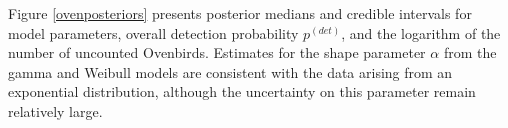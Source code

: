 \documentclass[12pt]{article}
\newcommand{\pdet}{p^{(det)}}
\begin{document}

Figure \ref{ovenposteriors} presents posterior medians and credible intervals for model parameters, overall detection probability $\pdet$, and the logarithm of the number of uncounted Ovenbirds.  
Estimates for the shape parameter $\alpha$ from the gamma and Weibull models are consistent with the data arising from an exponential distribution, although the uncertainty on this parameter remain relatively large. 
\end{document}
